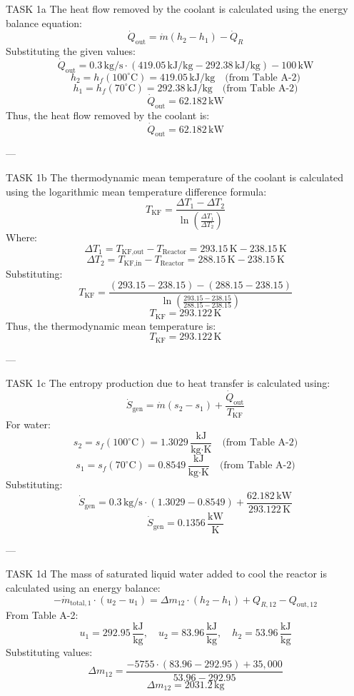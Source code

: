 TASK 1a  
The heat flow removed by the coolant is calculated using the energy balance equation:  
\[
\dot{Q}_{\text{out}} = \dot{m} (h_2 - h_1) - \dot{Q}_R
\]  
Substituting the given values:  
\[
\dot{Q}_{\text{out}} = 0.3 \, \text{kg/s} \cdot (419.05 \, \text{kJ/kg} - 292.38 \, \text{kJ/kg}) - 100 \, \text{kW}
\]  
\[
h_2 = h_f(100^\circ\text{C}) = 419.05 \, \text{kJ/kg} \quad \text{(from Table A-2)}
\]  
\[
h_1 = h_f(70^\circ\text{C}) = 292.38 \, \text{kJ/kg} \quad \text{(from Table A-2)}
\]  
\[
\dot{Q}_{\text{out}} = 62.182 \, \text{kW}
\]  
Thus, the heat flow removed by the coolant is:  
\[
\dot{Q}_{\text{out}} = 62.182 \, \text{kW}
\]  

---

TASK 1b  
The thermodynamic mean temperature of the coolant is calculated using the logarithmic mean temperature difference formula:  
\[
T_{\text{KF}} = \frac{\Delta T_1 - \Delta T_2}{\ln \left( \frac{\Delta T_1}{\Delta T_2} \right)}
\]  
Where:  
\[
\Delta T_1 = T_{\text{KF,out}} - T_{\text{Reactor}} = 293.15 \, \text{K} - 238.15 \, \text{K}
\]  
\[
\Delta T_2 = T_{\text{KF,in}} - T_{\text{Reactor}} = 288.15 \, \text{K} - 238.15 \, \text{K}
\]  
Substituting:  
\[
T_{\text{KF}} = \frac{(293.15 - 238.15) - (288.15 - 238.15)}{\ln \left( \frac{293.15 - 238.15}{288.15 - 238.15} \right)}
\]  
\[
T_{\text{KF}} = 293.122 \, \text{K}
\]  
Thus, the thermodynamic mean temperature is:  
\[
T_{\text{KF}} = 293.122 \, \text{K}
\]  

---

TASK 1c  
The entropy production due to heat transfer is calculated using:  
\[
\dot{S}_{\text{gen}} = \dot{m} (s_2 - s_1) + \frac{\dot{Q}_{\text{out}}}{T_{\text{KF}}}
\]  
For water:  
\[
s_2 = s_f(100^\circ\text{C}) = 1.3029 \, \frac{\text{kJ}}{\text{kg·K}} \quad \text{(from Table A-2)}
\]  
\[
s_1 = s_f(70^\circ\text{C}) = 0.8549 \, \frac{\text{kJ}}{\text{kg·K}} \quad \text{(from Table A-2)}
\]  
Substituting:  
\[
\dot{S}_{\text{gen}} = 0.3 \, \text{kg/s} \cdot (1.3029 - 0.8549) + \frac{62.182 \, \text{kW}}{293.122 \, \text{K}}
\]  
\[
\dot{S}_{\text{gen}} = 0.1356 \, \frac{\text{kW}}{\text{K}}
\]  

---

TASK 1d  
The mass of saturated liquid water added to cool the reactor is calculated using an energy balance:  
\[
-\dot{m}_{\text{total},1} \cdot (u_2 - u_1) = \Delta m_{12} \cdot (h_2 - h_1) + Q_{R,12} - Q_{\text{out},12}
\]  
From Table A-2:  
\[
u_1 = 292.95 \, \frac{\text{kJ}}{\text{kg}}, \quad u_2 = 83.96 \, \frac{\text{kJ}}{\text{kg}}, \quad h_2 = 53.96 \, \frac{\text{kJ}}{\text{kg}}
\]  
Substituting values:  
\[
\Delta m_{12} = \frac{-5755 \cdot (83.96 - 292.95) + 35,000}{53.96 - 292.95}
\]  
\[
\Delta m_{12} = 2031.2 \, \text{kg}
\]  

